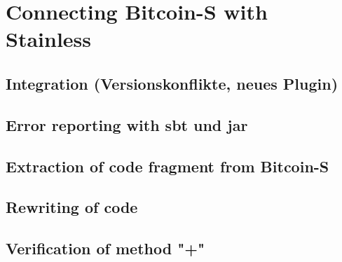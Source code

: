 \chapter{Connecting Bitcoin-S with Stainless}
\label{chap:connecting}

\section{Integration (Versionskonflikte, neues Plugin)}

\section{Error reporting with sbt und jar}

\section{Extraction of code fragment from Bitcoin-S}

\section{Rewriting of code}

\section{Verification of method "+"}